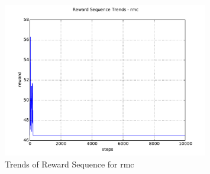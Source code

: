 \documentclass[compress]{beamer}
\begin{document}
\begin{frame}
\begin{figure}[htb!]
\centering
\includegraphics[width=0.8\textwidth]{trends_rmc.pdf}
\caption{\label{fig:trends_rmc}Trends of Reward Sequence for rmc}
\end{figure}  
\end{frame}
\end{document}
